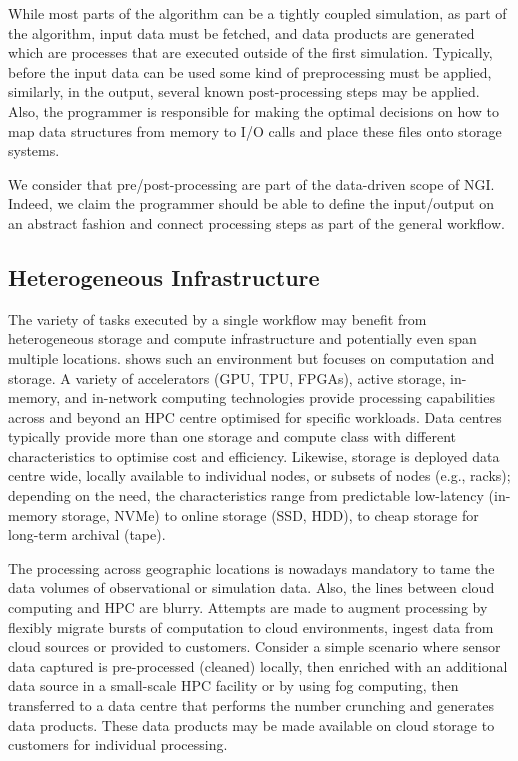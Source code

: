 \documentclass[a4paper, twocolumn]{article}
\begin{document}
While most parts of the algorithm can be a tightly coupled simulation, as part of the algorithm, input data must be fetched, and data products are generated which are processes that are executed outside of the first simulation.
Typically, before the input data can be used some kind of preprocessing must be applied, similarly, in the output, several known post-processing steps may be applied.
Also, the programmer is responsible for making the optimal decisions on how to map data structures from memory to I/O calls and place these files onto storage systems.

We consider that pre/post-processing are part of the data-driven scope of NGI.
Indeed, we claim the programmer should be able to define the input/output on an abstract fashion and connect processing steps as part of the general workflow.

\subsection{Heterogeneous Infrastructure}

The variety of tasks executed by a single workflow may benefit from heterogeneous storage and compute infrastructure and potentially even span multiple locations.
 shows such an environment but focuses on computation and storage.
A variety of accelerators (GPU, TPU, FPGAs), active storage, in-memory, and in-network computing technologies provide processing capabilities across and beyond an HPC centre optimised for specific workloads.
Data centres typically provide more than one storage and compute class with different characteristics to optimise cost and efficiency.
Likewise, storage is deployed data centre wide, locally available to individual nodes, or subsets of nodes (e.g., racks); depending on the need, the characteristics range from predictable low-latency (in-memory storage, NVMe) to online storage (SSD, HDD), to cheap storage for long-term archival (tape).

The processing across geographic locations is nowadays mandatory to tame the data volumes of observational or simulation data.
Also, the lines between cloud computing and HPC are blurry. Attempts are made to augment processing by flexibly migrate bursts of computation to cloud environments, ingest data from cloud sources or provided to customers.
Consider a simple scenario where sensor data captured is pre-processed (cleaned) locally, then enriched with an additional data source in a small-scale HPC facility or by using fog computing, then transferred to a data centre that performs the number crunching and generates data products.
These data products may be made available on cloud storage to customers for individual processing.
\end{document}
